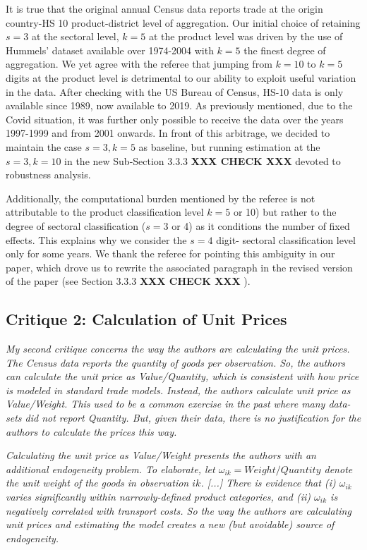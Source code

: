\documentclass[a4paper,11pt]{article}
\begin{document}
It is true that the original annual Census data reports trade at the origin country-HS 10 product-district level of aggregation. Our initial choice of retaining $s=3$ at the sectoral level, $k=5$ at the product level was driven by the use of Hummels' dataset available over 1974-2004 with $k=5$ the finest degree of aggregation. We yet agree with the referee that jumping from $k=10$ to $k=5$ digits at the product level is detrimental to our ability to exploit useful variation in the data. After checking with the US Bureau of Census, HS-10 data is only available since 1989, now available to 2019. As previously mentioned, due to the Covid situation, it was further only possible to receive the data over the years 1997-1999 and from 2001 onwards. In front of this arbitrage, we decided to maintain the case $s=3, k=5$ as baseline, but running estimation at the $s=3,k=10$ in the new Sub-Section 3.3.3 \textbf{XXX CHECK XXX }devoted to robustness analysis.

Additionally, the computational burden mentioned by the referee is not attributable to the product classification level $k=5$ or 10) but rather to the degree of sectoral classification ($s=3$ or 4) as it conditions the number of fixed effects. This explains why we consider the $s=4$ digit- sectoral classification level only for some years. We thank the referee for pointing this ambiguity in our paper, which drove us to rewrite the associated paragraph in the revised version of the paper (see Section 3.3.3 \textbf{XXX CHECK XXX }).


\subsection{Critique 2: Calculation of Unit Prices}

\textit{My second critique concerns the way the authors are calculating the unit prices.
The Census data reports the quantity of goods per observation. So, the authors
can calculate the unit price as Value/Quantity, which is consistent with how
price is modeled in standard trade models. Instead, the authors calculate unit
price as Value/Weight. This used to be a common exercise in the past where
many data-sets did not report Quantity. But, given their data, there is no
justification for the authors to calculate the prices this way.}

\textit{Calculating the unit price as Value/Weight presents the authors
with an additional endogeneity problem. To elaborate, let $\omega_{ik} = Weight/Quantity$
denote the unit weight of the goods in observation $ik$. [...] There is evidence that (i) $\omega_{ik}$ varies significantly within narrowly-defined product
categories, and (ii) $\omega_{ik}$ is negatively correlated with transport costs. So the
way the authors are calculating unit prices and estimating the model creates a
new (but avoidable) source of endogeneity.}
\end{document}
